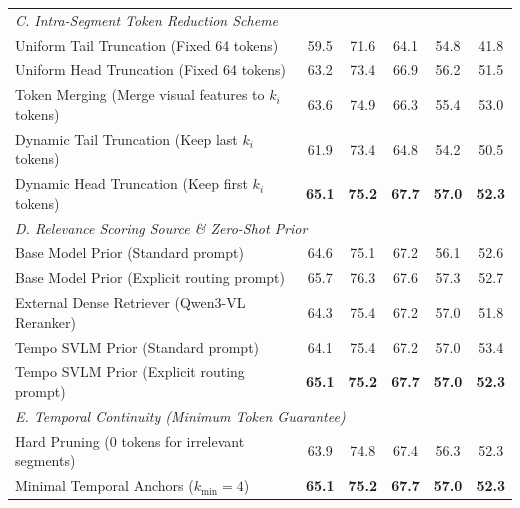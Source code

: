 \begin{table}[t]
{\begin{tabular}{l c c c c c}
        \multicolumn{6}{l}{\textit{C. Intra-Segment Token Reduction Scheme}} \\
        Uniform Tail Truncation (Fixed 64 tokens)              & 59.5 & 71.6 & 64.1 & 54.8 & 41.8 \\
        Uniform Head Truncation (Fixed 64 tokens)              & 63.2 & 73.4 & 66.9 & 56.2 & 51.5 \\ 
        Token Merging (Merge visual features to $k_i$ tokens)  & 63.6 & 74.9 & 66.3 & 55.4 & 53.0 \\
        Dynamic Tail Truncation (Keep last $k_i$ tokens)       & 61.9 & 73.4 & 64.8 & 54.2 & 50.5 \\
        \rowcolor{gray!10}Dynamic Head Truncation (Keep first $k_i$ tokens) & \textbf{65.1} & \textbf{75.2} & \textbf{67.7} & \textbf{57.0} & \textbf{52.3} \\
        \midrule
        
        \multicolumn{6}{l}{\textit{D. Relevance Scoring Source \& Zero-Shot Prior}} \\
        Base Model Prior (Standard prompt)                              & 64.6 & 75.1 & 67.2 & 56.1 & 52.6 \\
        Base Model Prior (Explicit routing prompt)                      & 65.7 & 76.3 & 67.6 & 57.3 & 52.7 \\
        External Dense Retriever (Qwen3-VL Reranker) & 64.3 & 75.4 & 67.2 & 57.0 & 51.8 \\
        Tempo SVLM Prior (Standard prompt)                               & 64.1 & 75.4 & 67.2 & 57.0 & 53.4 \\
        \rowcolor{gray!10} Tempo SVLM Prior (Explicit routing prompt)    & \textbf{65.1} & \textbf{75.2} & \textbf{67.7} & \textbf{57.0} & \textbf{52.3} \\
        \midrule

        \multicolumn{6}{l}{\textit{E. Temporal Continuity (Minimum Token Guarantee)}} \\
        Hard Pruning (0 tokens for irrelevant segments)            & 63.9 & 74.8 & 67.4 & 56.3 & 52.3 \\
        \rowcolor{gray!10} Minimal Temporal Anchors ($k_{\min}=4$) & \textbf{65.1} & \textbf{75.2} & \textbf{67.7} & \textbf{57.0} & \textbf{52.3} \\
        
        \bottomrule
    \end{tabular}
    }
    \vspace{-1.0em}
\end{table}